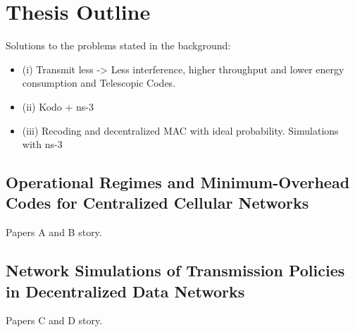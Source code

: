 \section{Thesis Outline}\label{sec:intro_thesis_outline}

Solutions to the problems stated in the background:

\begin{itemize}
\item  (i) Transmit less -> Less interference, higher throughput and lower energy consumption and Telescopic Codes.
\item (ii) Kodo + ns-3
\item (iii) Recoding and decentralized MAC with ideal probability. Simulations with ns-3
\end{itemize}

\subsection{Operational Regimes and Minimum-Overhead Codes for Centralized Cellular Networks}

Papers A and B story.

\subsection{Network Simulations of Transmission Policies in Decentralized Data Networks}

Papers C and D story.
